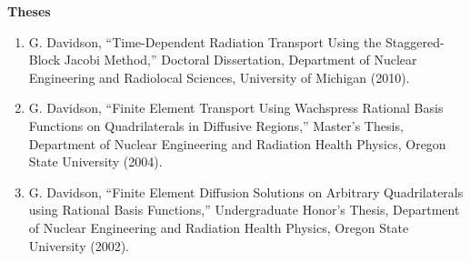 \documentclass[letterpaper,11pt]{article}
\newcommand{\leftsubheading}[1]{
  \textbf{#1\vspace{-6pt} \\}}
\begin{document}
\leftsubheading{Theses}
\begin{enumerate}
  \item G. Davidson, ``Time-Dependent Radiation Transport Using the
    Staggered-Block Jacobi Method,'' Doctoral Dissertation, Department
    of Nuclear Engineering and Radiolocal Sciences, University of
    Michigan (2010).
  \item G. Davidson, ``Finite Element Transport Using Wachspress
    Rational Basis Functions on Quadrilaterals in Diffusive Regions,''
    Master's Thesis, Department of Nuclear Engineering and Radiation
    Health Physics, Oregon State University (2004).
  \item G. Davidson, ``Finite Element Diffusion Solutions on Arbitrary
    Quadrilaterals using Rational Basis Functions,'' Undergraduate
    Honor's Thesis, Department of Nuclear Engineering and Radiation
    Health Physics, Oregon State University (2002).
\end{enumerate}

\end{document}

